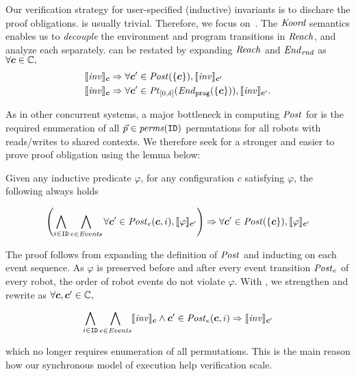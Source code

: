 Our  verification strategy for user-specified  (inductive) invariants is to dischare the proof obligations.
 is usually trivial. Therefore, we focus on~. The $\emph{Koord}$ semantics enables us to \emph{decouple} the environment and program transitions in $\mathit{Reach}$, and analyze each separately.  can be restated by expanding $\mathit{Reach}$ and $\mathit{End}_\mathit{rnd}$ as $\forall \mathit{\boldsymbol{c}} \in \mathbb{C},$
\begin{align}
\llbracket\mathit{inv}\rrbracket_{\mathit{\boldsymbol{c}}} &\Rightarrow \forall \mathit{\boldsymbol{c}}' \in \mathit{Post}(\left\{\mathit{\boldsymbol{c}}\right\}), \llbracket\mathit{inv}\rrbracket_{\mathit{\boldsymbol{c}}'}\label{po:ind-hyp-prog}\\
\llbracket\mathit{inv}\rrbracket_{\mathit{\boldsymbol{c}}} &\Rightarrow \forall \mathit{\boldsymbol{c}}' \in \mathit{Pt}_{[0,\delta]}(\mathit{End}_{\mathtt{prog}}(\left\{\mathit{\boldsymbol{c}}\right\})), \llbracket\mathit{inv}\rrbracket_{\mathit{\boldsymbol{c}}'}.\label{po:ind-hyp-env}
\end{align}

As in other concurrent systems, a major bottleneck in computing $\mathit{Post}$ for  is the required enumeration of all $\vec{p}\in \mathit{perms}(\texttt{ID})$ permutations for all robots with reads/writes to shared contexts. We therefore seek for a stronger and easier to prove proof obligation using the lemma below:
\begin{lemma}
   \label{lem:noninter}
Given any inductive predicate $\varphi$,
for any configuration $c$ satisfying $\varphi$, the following always holds
\begin{small}
\[
\left(\bigwedge_{i\in \texttt{ID}}\bigwedge_{e \in \mathit{Events}} \forall \mathit{\boldsymbol{c}}' \in \mathit{Post}_e(\mathit{\boldsymbol{c}}, i), \llbracket\varphi\rrbracket_{\mathit{\boldsymbol{c}}'}\right)
    \Rightarrow \forall \mathit{\boldsymbol{c}}' \in \mathit{Post}(\left\{\mathit{\boldsymbol{c}}\right\}), \llbracket\varphi\rrbracket_{\mathit{\boldsymbol{c}}'}
\]
\end{small}
\end{lemma}
The proof follows from expanding the definition of $\mathit{Post}$ and inducting on each event sequence. 
As $\varphi$ is preserved before and after every event transition $\mathit{Post}_e$ of every robot,
the order of robot events do not violate $\varphi$.
With , we strengthen and rewrite  as $\forall \mathit{\boldsymbol{c}}, \mathit{\boldsymbol{c}}' \in \mathbb{C},$
\begin{small}
\begin{equation}
\bigwedge_{i\in \texttt{ID}}\bigwedge_{e \in \mathit{Events}} \llbracket\mathit{inv}\rrbracket_{\mathit{\boldsymbol{c}}} \land \mathit{\boldsymbol{c}}' \in \mathit{Post}_e(\mathit{\boldsymbol{c}}, i)
    \Rightarrow \llbracket\mathit{inv}\rrbracket_{\mathit{\boldsymbol{c}}'}\label{po:ind-hyp-event}
\end{equation}
\end{small}%
which no longer requires enumeration of all permutations.
This is the main reason how our synchronous model of execution help verification scale.

